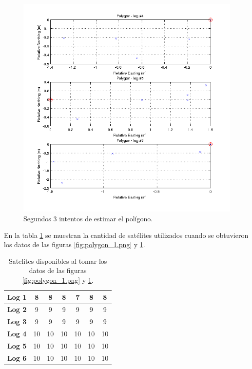 \documentclass[spanish,12pt,a4paper,titlepage]{report}
\begin{document}
\newpage
\begin{figure}[h!]
  \begin{center}
  \includegraphics[width=1\textwidth]{./img/polygon_2.png}
  \end{center}
  \caption{Segundos 3 intentos de estimar el polígono.}
  \label{fig:polygon_2.png}
\end{figure}

En la tabla \ref{tab:polygon-sat} se muestran la cantidad de satélites utilizados cuando se obtuvieron los datos de las figuras \ref{fig:polygon_1.png} y \ref{fig:polygon_2.png}.

\begin{table}[H]
\begin{center}
\begin{tabular}{|l||c|c|c|c|c|c|}
\hline
\textbf{Log 1} & 8 & 8 & 8 & 7 & 8 & 8 \\
\hline
\textbf{Log 2} & 9 & 9 & 9 & 9 & 9 & 9 \\
\hline
\textbf{Log 3} & 9 & 9 & 9 & 9 & 9 & 9 \\
\hline
\textbf{Log 4} & 10 & 10 & 10 & 10 & 10 & 10 \\
\hline
\textbf{Log 5} & 10 & 10 & 10 & 10 & 10 & 10 \\
\hline
\textbf{Log 6} & 10 & 10 & 10 & 10 & 10 & 10\\
\hline
\end{tabular} 
\caption{Satelites disponibles al tomar los datos de las figuras \ref{fig:polygon_1.png} y \ref{fig:polygon_2.png}.}
\label{tab:polygon-sat}
\end{center}
\end{table}
\end{document}
